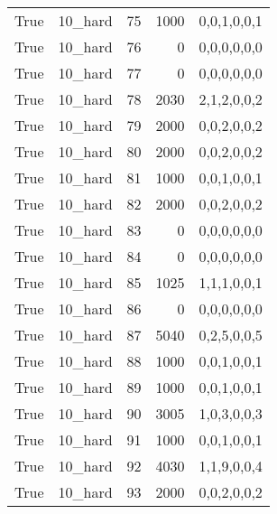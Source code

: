\begin{tabular}{llrrl}
 True            & 10\_hard             &            75 &                  1000 & 0,0,1,0,0,1   \\
 True            & 10\_hard             &            76 &                     0 & 0,0,0,0,0,0   \\
 True            & 10\_hard             &            77 &                     0 & 0,0,0,0,0,0   \\
 True            & 10\_hard             &            78 &                  2030 & 2,1,2,0,0,2   \\
 True            & 10\_hard             &            79 &                  2000 & 0,0,2,0,0,2   \\
 True            & 10\_hard             &            80 &                  2000 & 0,0,2,0,0,2   \\
 True            & 10\_hard             &            81 &                  1000 & 0,0,1,0,0,1   \\
 True            & 10\_hard             &            82 &                  2000 & 0,0,2,0,0,2   \\
 True            & 10\_hard             &            83 &                     0 & 0,0,0,0,0,0   \\
 True            & 10\_hard             &            84 &                     0 & 0,0,0,0,0,0   \\
 True            & 10\_hard             &            85 &                  1025 & 1,1,1,0,0,1   \\
 True            & 10\_hard             &            86 &                     0 & 0,0,0,0,0,0   \\
 True            & 10\_hard             &            87 &                  5040 & 0,2,5,0,0,5   \\
 True            & 10\_hard             &            88 &                  1000 & 0,0,1,0,0,1   \\
 True            & 10\_hard             &            89 &                  1000 & 0,0,1,0,0,1   \\
 True            & 10\_hard             &            90 &                  3005 & 1,0,3,0,0,3   \\
 True            & 10\_hard             &            91 &                  1000 & 0,0,1,0,0,1   \\
 True            & 10\_hard             &            92 &                  4030 & 1,1,9,0,0,4   \\
 True            & 10\_hard             &            93 &                  2000 & 0,0,2,0,0,2   \\

\end{tabular}

